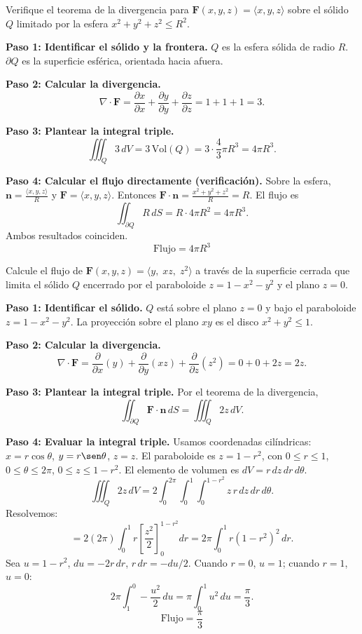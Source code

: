 \begin{example}
Verifique el teorema de la divergencia para $\mathbf{F}(x,y,z)=\langle x,y,z\rangle$ sobre el sólido $Q$ limitado por la esfera $x^2+y^2+z^2\le R^2$.
\begin{myproof}
\textbf{Paso 1: Identificar el sólido y la frontera.}
$Q$ es la esfera sólida de radio $R$. $\partial Q$ es la superficie esférica, orientada hacia afuera.

\textbf{Paso 2: Calcular la divergencia.}
\[
\nabla\cdot\mathbf{F} = \frac{\partial x}{\partial x}+\frac{\partial y}{\partial y}+\frac{\partial z}{\partial z} = 1+1+1=3.
\]

\textbf{Paso 3: Plantear la integral triple.}
\[
\iiint_Q 3\,dV = 3\,\text{Vol}(Q) = 3\cdot\frac{4}{3}\pi R^3 = 4\pi R^3.
\]

\textbf{Paso 4: Calcular el flujo directamente (verificación).}
Sobre la esfera, $\mathbf{n} = \frac{\langle x,y,z\rangle}{R}$ y $\mathbf{F}=\langle x,y,z\rangle$. Entonces $\mathbf{F}\cdot\mathbf{n} = \frac{x^2+y^2+z^2}{R} = R$. El flujo es
\[
\iint_{\partial Q} R\,dS = R\cdot 4\pi R^2 = 4\pi R^3.
\]
Ambos resultados coinciden.
\[
\boxed{\text{Flujo} = 4\pi R^3}
\]
\end{myproof}
\end{example}

\begin{example}
Calcule el flujo de $\mathbf{F}(x,y,z)=\langle y,\; xz,\; z^2\rangle$ a través de la superficie cerrada que limita el sólido $Q$ encerrado por el paraboloide $z=1-x^2-y^2$ y el plano $z=0$.
\begin{myproof}
\textbf{Paso 1: Identificar el sólido.}
$Q$ está sobre el plano $z=0$ y bajo el paraboloide $z=1-x^2-y^2$. La proyección sobre el plano $xy$ es el disco $x^2+y^2\le 1$.

\textbf{Paso 2: Calcular la divergencia.}
\[
\nabla\cdot\mathbf{F}
= \frac{\partial}{\partial x}(y) + \frac{\partial}{\partial y}(xz) + \frac{\partial}{\partial z}(z^2)
= 0 + 0 + 2z = 2z.
\]

\textbf{Paso 3: Plantear la integral triple.}
Por el teorema de la divergencia,
\[
\iint_{\partial Q}\mathbf{F}\cdot\mathbf{n}\,dS
= \iiint_Q 2z\,dV.
\]

\textbf{Paso 4: Evaluar la integral triple.}
Usamos coordenadas cilíndricas: $x=r\cos\theta$, $y=r\sen\theta$, $z=z$. El paraboloide es $z=1-r^2$, con $0\le r\le 1$, $0\le\theta\le 2\pi$, $0\le z\le 1-r^2$. El elemento de volumen es $dV = r\,dz\,dr\,d\theta$.
\[
\iiint_Q 2z\,dV
= 2\int_0^{2\pi}\int_0^1\int_0^{1-r^2} z\,r\,dz\,dr\,d\theta.
\]
Resolvemos:
\[
= 2(2\pi)\int_0^1 r\left[\frac{z^2}{2}\right]_0^{1-r^2} dr
= 2\pi\int_0^1 r(1-r^2)^2\,dr.
\]
Sea $u=1-r^2$, $du=-2r\,dr$, $r\,dr=-du/2$. Cuando $r=0$, $u=1$; cuando $r=1$, $u=0$:
\[
2\pi\int_1^0 -\frac{u^2}{2}\,du = \pi\int_0^1 u^2\,du = \frac{\pi}{3}.
\]
\[
\boxed{\text{Flujo} = \frac{\pi}{3}}
\]
\end{myproof}
\end{example}

